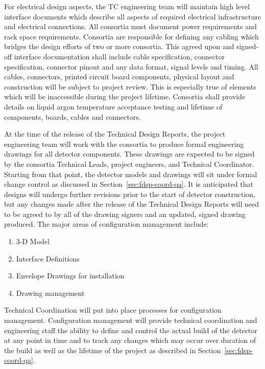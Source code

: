 For electrical design aspects, the TC engineering team will maintain
high level interface documents which describe all aspects of required
electrical infrastructure and electrical connections. All consortia
must document power requirements and rack space
requirements. Consortia are responsible for defining any cabling which
bridges the design efforts of two or more consortia. This agreed upon
and signed-off interface documentation shall include cable
specification, connector specification, connector pinout and any data
format, signal levels and timing. All cables, connectors, printed
circuit board components, physical layout and construction will be
subject to project review. This is especially true of elements which
will be inaccessible during the project lifetime. Consortia shall
provide details on liquid argon temperature acceptance testing and
lifetime of components, boards, cables and connectors.


At the time of the release of the Technical Design Reports, the
project engineering team will work with the consortia to produce
formal engineering drawings for all detector components.  These
drawings are expected to be signed by the consortia Technical Leads,
project engineers, and Technical Coordinator.  Starting from that
point, the detector models and drawings will sit under formal change
control as discussed in Section~\ref{sec:fdsp-coord-qa}.  It is
anticipated that designs will undergo further revisions prior to the
start of detector construction, but any changes made after the release
of the Technical Design Reports will need to be agreed to by all of
the drawing signers and an updated, signed drawing produced. The major
areas of configuration management include:
\begin{enumerate}
  \item 3-D Model
  \item Interface Definitions
  \item Envelope Drawings for installation
  \item Drawing management
\end{enumerate}

Technical Coordination will put into place processes for configuration
management.  Configuration management will provide technical
coordination and engineering staff the ability to define and control
the actual build of the detector at any point in time and to track any
changes which may occur over duration of the build as well as the
lifetime of the project as described in
Section~\ref{sec:fdsp-coord-qa}.

